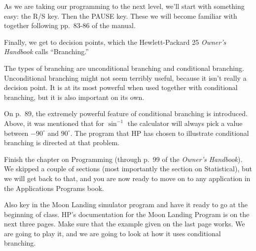 As we are taking our programming to the next level, we'll start with something easy: the R/S key. Then the PAUSE key. These we will become familiar with together following pp.~83-86 of the manual.

Finally, we get to decision points, which the Hewlett-Packard 25 {\it Owner's Handbook} calls ``Branching.''

\bigskip

\nobreak\bigskip

\noindent The types of branching are unconditional branching and conditional branching. Unconditional branching might not seem terribly useful, because it isn't really a decision point. It is at its most powerful when used together with conditional branching, but it is also important on its own.

\bigskip

\nobreak\bigskip

\noindent On p.~89, the extremely powerful feature of conditional branching is introduced. Above, it was mentioned that for $\sin^{-1}$ the calculator will always pick a value between $-90^{\circ}$ and $90^{\circ}$. The program that HP has chosen to illustrate conditional branching is directed at that problem.

\bigskip

\nobreak\bigskip

\noindent Finish the chapter on Programming (through p.~99 of the {\it Owner's Handbook}). We skipped a couple of sections (most importantly the section on Statistical), but we will get back to that, and you are now ready to move on to any application in the Applications Programs book.

Also key in the Moon Landing simulator program and have it ready to go at the beginning of class. HP's documentation for the Moon Landing Program is on the next three pages. Make sure that the example given on the last page works. We are going to play it, and we are going to look at how it uses conditional branching. 

\bye

